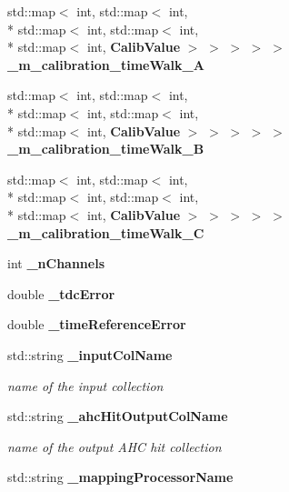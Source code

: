 \begin{DoxyCompactItemize}
\item 
std\-::map$<$ int, std\-::map$<$ int, \\*
std\-::map$<$ int, std\-::map$<$ int, \\*
std\-::map$<$ int, {\bf Calib\-Value} $>$ $>$ $>$ $>$ $>$ {\bfseries \-\_\-m\-\_\-calibration\-\_\-time\-Walk\-\_\-\-A}\label{classCALICE_1_1Ahc2TimeCalibrator_ad0a16941e1683907356d77461dd45eba}

\item 
std\-::map$<$ int, std\-::map$<$ int, \\*
std\-::map$<$ int, std\-::map$<$ int, \\*
std\-::map$<$ int, {\bf Calib\-Value} $>$ $>$ $>$ $>$ $>$ {\bfseries \-\_\-m\-\_\-calibration\-\_\-time\-Walk\-\_\-\-B}\label{classCALICE_1_1Ahc2TimeCalibrator_a4db838d0d776f380426f63860bbaa214}

\item 
std\-::map$<$ int, std\-::map$<$ int, \\*
std\-::map$<$ int, std\-::map$<$ int, \\*
std\-::map$<$ int, {\bf Calib\-Value} $>$ $>$ $>$ $>$ $>$ {\bfseries \-\_\-m\-\_\-calibration\-\_\-time\-Walk\-\_\-\-C}\label{classCALICE_1_1Ahc2TimeCalibrator_a17084934e1788a37037f9e130db4bbed}

\item 
int {\bfseries \-\_\-n\-Channels}\label{classCALICE_1_1Ahc2TimeCalibrator_aa5b8cbd07c30249556a8e2a36320d430}

\item 
double {\bfseries \-\_\-tdc\-Error}\label{classCALICE_1_1Ahc2TimeCalibrator_a0f493e5b59d9067a36743f9f680294f0}

\item 
double {\bfseries \-\_\-time\-Reference\-Error}\label{classCALICE_1_1Ahc2TimeCalibrator_aa849707a3a42de7e23c9f4eba28034c5}

\item 
std\-::string {\bf \-\_\-input\-Col\-Name}\label{classCALICE_1_1Ahc2TimeCalibrator_a1f129629f332173ceb51063af096d2c5}

\begin{DoxyCompactList}\small\item\em name of the input collection \end{DoxyCompactList}\item 
std\-::string {\bf \-\_\-ahc\-Hit\-Output\-Col\-Name}\label{classCALICE_1_1Ahc2TimeCalibrator_a7f5d3fd865838898b136b4a67c62947b}

\begin{DoxyCompactList}\small\item\em name of the output A\-H\-C hit collection \end{DoxyCompactList}\item 
std\-::string {\bf \-\_\-mapping\-Processor\-Name}\label{classCALICE_1_1Ahc2TimeCalibrator_a3acabba4b48f6b02b20e620ff5fbfe1e}


\end{DoxyCompactItemize}
